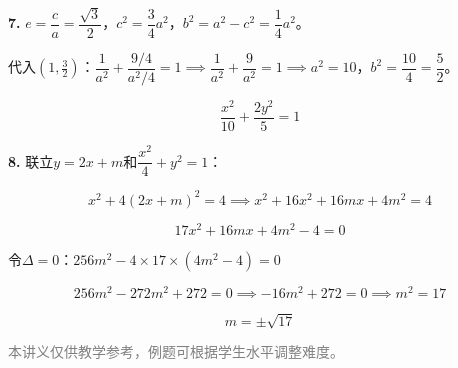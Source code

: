 \documentclass[12pt, a4paper]{ctexart}
\begin{document}
\begin{knowledgebox}[参考答案]
\textbf{7.} $e = \dfrac{c}{a} = \dfrac{\sqrt{3}}{2}$，$c^2 = \dfrac{3}{4}a^2$，$b^2 = a^2 - c^2 = \dfrac{1}{4}a^2$。

代入$(1, \frac{3}{2})$：$\dfrac{1}{a^2} + \dfrac{9/4}{a^2/4} = 1 \implies \dfrac{1}{a^2} + \dfrac{9}{a^2} = 1 \implies a^2 = 10$，$b^2 = \dfrac{10}{4} = \dfrac{5}{2}$。

$$\boxed{\dfrac{x^2}{10} + \dfrac{2y^2}{5} = 1}$$

\vspace{6pt}

\textbf{8.} 联立$y = 2x + m$和$\dfrac{x^2}{4} + y^2 = 1$：

$$x^2 + 4(2x+m)^2 = 4 \implies x^2 + 16x^2 + 16mx + 4m^2 = 4$$

$$17x^2 + 16mx + 4m^2 - 4 = 0$$

令$\Delta = 0$：$256m^2 - 4 \times 17 \times (4m^2 - 4) = 0$

$$256m^2 - 272m^2 + 272 = 0 \implies -16m^2 + 272 = 0 \implies m^2 = 17$$

$$\boxed{m = \pm\sqrt{17}}$$

\end{knowledgebox}

\vfill
\begin{center}
\small\textcolor{gray}{本讲义仅供教学参考，例题可根据学生水平调整难度。}
\end{center}
\end{document}
